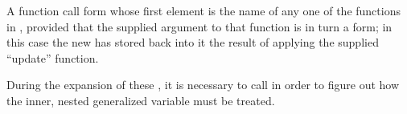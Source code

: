 % 
% 

\itemitem{\bull}
A function call form whose first element is the name of
any one of the functions in \thenextfigure, 
provided that the supplied argument
to that function is in turn a  form;
in this case the new  has stored back into it the
result of applying the supplied ``update'' function.

During the  expansion of these , it is necessary to call 
in order to figure out how the inner, nested generalized variable must be treated.  
 
